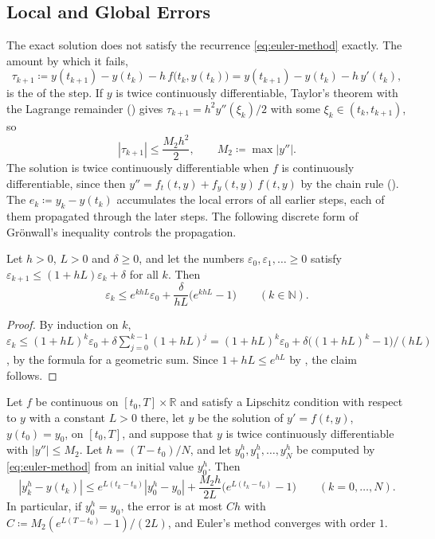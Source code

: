 \subsection{Local and Global Errors}

The exact solution does not satisfy the recurrence \eqref{eq:euler-method} exactly. The amount by which it fails,
\[
\tau_{k+1}\coloneqq y(t_{k+1})-y(t_k)-h\,f\bigl(t_k,y(t_k)\bigr)=y(t_{k+1})-y(t_k)-h\,y'(t_k),
\]
is the  of the step. If $y$ is twice continuously differentiable, Taylor's theorem with the Lagrange remainder () gives $\tau_{k+1}=h^2y''(\xi_k)/2$ with some $\xi_k\in(t_k,t_{k+1})$, so
\[
|\tau_{k+1}|\le\frac{M_2h^2}2,\qquad M_2\coloneqq\max|y''| .
\]
The solution is twice continuously differentiable when $f$ is continuously differentiable, since then $y''=f_t(t,y)+f_y(t,y)\,f(t,y)$ by the chain rule (). The  $e_k\coloneqq y_k-y(t_k)$ accumulates the local errors of all earlier steps, each of them propagated through the later steps. The following discrete form of Gr\"onwall's inequality controls the propagation.

\begin{lemma}
\label{lem:discrete-gronwall}
Let $h>0$, $L>0$ and $\delta\ge0$, and let the numbers $\varepsilon_0,\varepsilon_1,\ldots\ge0$ satisfy $\varepsilon_{k+1}\le(1+hL)\varepsilon_k+\delta$ for all $k$. Then
\[
\varepsilon_k\le e^{khL}\varepsilon_0+\frac\delta{hL}\bigl(e^{khL}-1\bigr)\qquad(k\in\mathbb N).
\]
\end{lemma}

\begin{proof}
By induction on $k$, $\varepsilon_k\le(1+hL)^k\varepsilon_0+\delta\sum_{j=0}^{k-1}(1+hL)^j=(1+hL)^k\varepsilon_0+\delta\bigl((1+hL)^k-1\bigr)/(hL)$, by the formula for a geometric sum. Since $1+hL\le e^{hL}$ by , the claim follows.
\end{proof}

\begin{theorem}
\label{thm:euler-convergence}
Let $f$ be continuous on $[t_0,T]\times\mathbb R$ and satisfy a Lipschitz condition with respect to $y$ with a constant $L>0$ there, let $y$ be the solution of $y'=f(t,y)$, $y(t_0)=y_0$, on $[t_0,T]$, and suppose that $y$ is twice continuously differentiable with $|y''|\le M_2$. Let $h=(T-t_0)/N$, and let $y_0^h,y_1^h,\ldots,y_N^h$ be computed by \eqref{eq:euler-method} from an initial value $y_0^h$. Then
\[
|y_k^h-y(t_k)|\le e^{L(t_k-t_0)}|y_0^h-y_0|+\frac{M_2h}{2L}\bigl(e^{L(t_k-t_0)}-1\bigr)\qquad(k=0,\ldots,N).
\]
In particular, if $y_0^h=y_0$, the error is at most $Ch$ with $C\coloneqq M_2(e^{L(T-t_0)}-1)/(2L)$, and Euler's method converges with order $1$.
\end{theorem}


